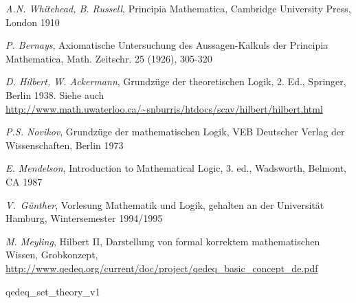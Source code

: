 \documentclass[a4paper,german,10pt,twoside]{book}
\theoremstyle{definition}
\theoremstyle{remark}
\begin{document}
\begin{thebibliography}{99}
 \emph{A.N. Whitehead, B. Russell}, Principia Mathematica, Cambridge University Press, London 1910

 \emph{P. Bernays}, Axiomatische Untersuchung des Aussagen-Kalkuls der {\glqq Principia Mathematica\grqq}, Math. Zeitschr. 25 (1926), 305-320

 \emph{D. Hilbert, W. Ackermann}, Grundz{\"u}ge der theoretischen Logik, 2. Ed., Springer, Berlin 1938. Siehe auch \url{http://www.math.uwaterloo.ca/~snburris/htdocs/scav/hilbert/hilbert.html}

 \emph{P.S. Novikov}, Grundz{\"u}ge der mathematischen Logik, VEB Deutscher Verlag der Wissenschaften, Berlin 1973

 \emph{E. Mendelson}, Introduction to Mathematical Logic, 3. ed., Wadsworth, Belmont, CA 1987

 \emph{V.~G{\"u}nther}, Vorlesung {\glqq Mathematik und Logik\grqq}, gehalten an der Universit{\"a}t Hamburg, Wintersemester 1994/1995

 \emph{M. Meyling}, Hilbert II, Darstellung von formal korrektem mathematischen Wissen, Grobkonzept, \url{http://www.qedeq.org/current/doc/project/qedeq_basic_concept_de.pdf}



 qedeq\_set\_theory\_v1


\end{thebibliography}
\backmatter

 \printindex
\end{document}
